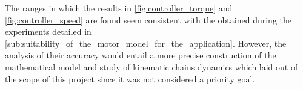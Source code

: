 The ranges in which the results in \ref{fig:controller_torque} and \ref{fig:controller_speed} are found seem consistent with the obtained during the experiments detailed in \ref{sub:suitability_of_the_motor_model_for_the_application}.
However, the analysis of their accuracy would entail a more precise construction of the mathematical model and study of kinematic chains dynamics which laid out of the scope of this project since it was not considered a priority goal.

